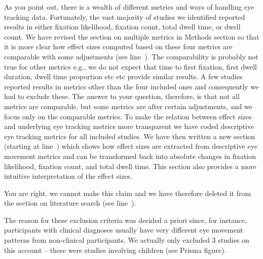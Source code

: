As you point out, there is a wealth of different metrics and ways of handling eye tracking data. Fortunately, the vast majority of studies we identified reported results in either fixation likelihood, fixation count, total dwell time, or dwell count. We have revised the section on multiple metrics in Methods section so that it is more clear how effect sizes computed based on these four metrics are comparable with some adjustments (see line~). The comparability is probably not true for other metrics e.g., we do not expect that time to first fixation, first dwell duration, dwell time proportion etc etc provide similar results. A few studies reported results in metrics other than the four included ones and consequently we had to exclude these. The answer to your question, therefore, is that not all metrics are comparable, but some metrics are after certain adjustments, and we focus only on the comparable metrics. To make the relation between effect sizes and underlying eye tracking metrics more transparent we have coded descriptive eye tracking metrics for all included studies. We have then written a new section (starting at line~) which shows how effect sizes are extracted from descriptive eye movement metrics and can be transformed back into absolute changes in fixation likelihood, fixation count, and total dwell time. This section also provides a more intuitive interpretation of the effect sizes. 



You are right, we cannot make this claim and we have therefore deleted it from the section on literature search (see line~). 



The reason for these exclusion criteria was decided a priori since, for instance, participants with clinical diagnoses usually have very different eye movement patterns from non-clinical participants. We actually only excluded 3 studies on this account -- these were studies involving children (see Prisma figure).


